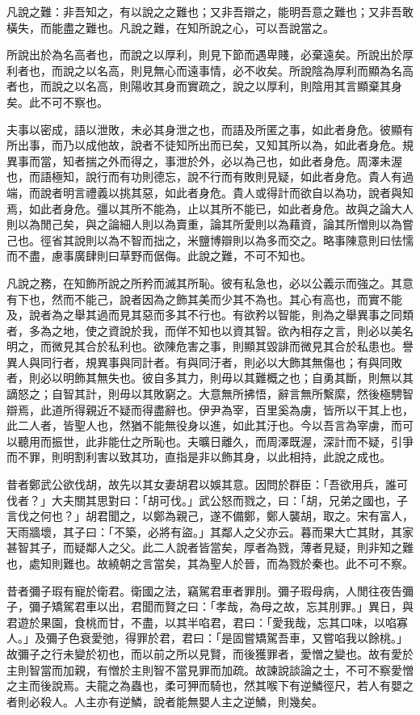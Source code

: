 
\begin{pinyinscope}
凡說之難：非吾知之，有以說之之難也；又非吾辯之，能明吾意之難也；又非吾敢橫失，而能盡之難也。凡說之難，在知所說之心，可以吾說當之。

所說出於為名高者也，而說之以厚利，則見下節而遇卑賤，必棄遠矣。所說出於厚利者也，而說之以名高，則見無心而遠事情，必不收矣。所說陰為厚利而顯為名高者也，而說之以名高，則陽收其身而實疏之，說之以厚利，則陰用其言顯棄其身矣。此不可不察也。

夫事以密成，語以泄敗，未必其身泄之也，而語及所匿之事，如此者身危。彼顯有所出事，而乃以成他故，說者不徒知所出而已矣，又知其所以為，如此者身危。規異事而當，知者揣之外而得之，事泄於外，必以為己也，如此者身危。周澤未渥也，而語極知，說行而有功則德忘，說不行而有敗則見疑，如此者身危。貴人有過端，而說者明言禮義以挑其惡，如此者身危。貴人或得計而欲自以為功，說者與知焉，如此者身危。彊以其所不能為，止以其所不能已，如此者身危。故與之論大人則以為閒己矣，與之論細人則以為賣重，論其所愛則以為藉資，論其所憎則以為嘗己也。徑省其說則以為不智而拙之，米鹽博辯則以為多而交之。略事陳意則曰怯懦而不盡，慮事廣肆則曰草野而倨侮。此說之難，不可不知也。

凡說之務，在知飾所說之所矜而滅其所恥。彼有私急也，必以公義示而強之。其意有下也，然而不能己，說者因為之飾其美而少其不為也。其心有高也，而實不能及，說者為之舉其過而見其惡而多其不行也。有欲矜以智能，則為之舉異事之同類者，多為之地，使之資說於我，而佯不知也以資其智。欲內相存之言，則必以美名明之，而微見其合於私利也。欲陳危害之事，則顯其毀誹而微見其合於私患也。譽異人與同行者，規異事與同計者。有與同汙者，則必以大飾其無傷也；有與同敗者，則必以明飾其無失也。彼自多其力，則毋以其難概之也；自勇其斷，則無以其謫怒之；自智其計，則毋以其敗窮之。大意無所拂悟，辭言無所繫縻，然後極騁智辯焉，此道所得親近不疑而得盡辭也。伊尹為宰，百里奚為虜，皆所以干其上也，此二人者，皆聖人也，然猶不能無役身以進，如此其汙也。今以吾言為宰虜，而可以聽用而振世，此非能仕之所恥也。夫曠日離久，而周澤既渥，深計而不疑，引爭而不罪，則明割利害以致其功，直指是非以飾其身，以此相持，此說之成也。

昔者鄭武公欲伐胡，故先以其女妻胡君以娛其意。因問於群臣：「吾欲用兵，誰可伐者？」大夫關其思對曰：「胡可伐。」武公怒而戮之，曰：「胡，兄弟之國也，子言伐之何也？」胡君聞之，以鄭為親己，遂不備鄭，鄭人襲胡，取之。宋有富人，天雨牆壞，其子曰：「不築，必將有盜。」其鄰人之父亦云。暮而果大亡其財，其家甚智其子，而疑鄰人之父。此二人說者皆當矣，厚者為戮，薄者見疑，則非知之難也，處知則難也。故繞朝之言當矣，其為聖人於晉，而為戮於秦也。此不可不察。

昔者彌子瑕有寵於衛君。衛國之法，竊駕君車者罪刖。彌子瑕母病，人閒往夜告彌子，彌子矯駕君車以出，君聞而賢之曰：「孝哉，為母之故，忘其刖罪。」異日，與君遊於果園，食桃而甘，不盡，以其半啗君，君曰：「愛我哉，忘其口味，以啗寡人。」及彌子色衰愛弛，得罪於君，君曰：「是固嘗矯駕吾車，又嘗啗我以餘桃。」故彌子之行未變於初也，而以前之所以見賢，而後獲罪者，愛憎之變也。故有愛於主則智當而加親，有憎於主則智不當見罪而加疏。故諫說談論之士，不可不察愛憎之主而後說焉。夫龍之為蟲也，柔可狎而騎也，然其喉下有逆鱗徑尺，若人有嬰之者則必殺人。人主亦有逆鱗，說者能無嬰人主之逆鱗，則幾矣。


\end{pinyinscope}